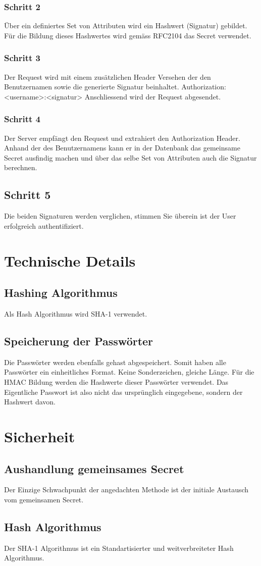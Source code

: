 \documentclass[10pt,a4paper]{scrartcl}
\begin{document}
\subsubsection{Schritt 2}
Über ein definiertes Set von Attributen wird ein Hashwert (Signatur) gebildet. Für die Bildung dieses Hashwertes wird gemäss RFC2104 das Secret verwendet.
\subsubsection{Schritt 3}
Der Request wird mit einem zusätzlichen Header Versehen der den Benutzernamen sowie die generierte Signatur beinhaltet. Authorization: <username>:<signatur>
Anschliessend wird der Request abgesendet.
\subsubsection*{Schritt 4}
Der Server empfängt den Request und extrahiert den Authorization Header. Anhand der des Benutzernamens kann er in der Datenbank das gemeinsame Secret ausfindig machen und über das selbe Set von Attributen auch die Signatur berechnen.
\subsection*{Schritt 5}
Die beiden Signaturen werden verglichen, stimmen Sie überein ist der User erfolgreich authentifiziert.

\section{Technische Details}
\subsection*{Hashing Algorithmus}
Als Hash Algorithmus wird SHA-1 verwendet.
\subsection*{Speicherung der Passwörter}
Die Passwörter werden ebenfalls gehast abgespeichert. Somit haben alle Passwörter ein einheitliches Format. Keine Sonderzeichen, gleiche Länge. Für die HMAC Bildung werden die Hashwerte dieser Passwörter verwendet. Das Eigentliche Passwort ist also nicht das ursprünglich eingegebene, sondern der Hashwert davon.
\section*{Sicherheit}
\subsection*{Aushandlung gemeinsames Secret}
Der Einzige Schwachpunkt der angedachten Methode ist der initiale Austausch vom gemeinsamen Secret.
\subsection*{Hash Algorithmus}
Der SHA-1 Algorithmus ist ein Standartisierter und weitverbreiteter Hash Algorithmus.
\end{document}

